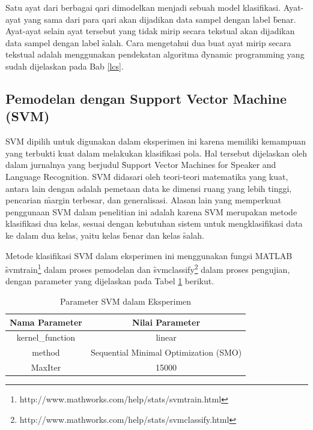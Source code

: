 Satu ayat dari berbagai qari dimodelkan menjadi sebuah model klasifikasi. Ayat-ayat yang sama dari para qari akan dijadikan data sampel dengan label \f{benar}. Ayat-ayat selain ayat tersebut yang tidak mirip secara tekstual akan dijadikan data sampel dengan label \f{salah}. Cara mengetahui dua buat ayat mirip secara tekstual adalah menggunakan pendekatan algoritma \f{dynamic programming} yang sudah dijelaskan pada Bab \ref{lcs}.

	\subsection{Pemodelan dengan Support Vector Machine (SVM)}
	SVM dipilih untuk digunakan dalam eksperimen ini karena memiliki kemampuan yang terbukti kuat dalam melakukan klasifikasi pola. Hal tersebut dijelaskan oleh \cite{campbell2006support} dalam jurnalnya yang berjudul \f{Support Vector Machines for Speaker and Language Recognition}. SVM didasari oleh teori-teori matematika yang kuat, antara lain dengan adalah pemetaan data ke dimensi ruang yang lebih tinggi, pencarian \f{margin} terbesar, dan generalisasi. Alasan lain yang memperkuat penggunaan SVM dalam penelitian ini adalah karena SVM merupakan metode klasifikasi dua kelas, sesuai dengan kebutuhan sistem untuk mengklasifikasi data ke dalam dua kelas, yaitu kelas \f{benar} dan kelas \f{salah}.

  Metode klasifikasi SVM dalam eksperimen ini menggunakan fungsi MATLAB \f{svmtrain}\footnote{http://www.mathworks.com/help/stats/svmtrain.html} dalam proses pemodelan dan \f{svmclassify}\footnote{http://www.mathworks.com/help/stats/svmclassify.html} dalam proses pengujian, dengan parameter yang dijelaskan pada Tabel \ref{table:parametersvm} berikut.

  \begin{table}
    \centering
    \caption{Parameter SVM dalam Eksperimen}
    \begin{tabular}{|c|c|}
      \hline
      \textbf{Nama Parameter} & \textbf{Nilai Parameter} \\ \hline
      kernel\_function & linear \\ \hline
      method & Sequential Minimal Optimization (SMO) \\ \hline
      MaxIter & 15000 \\ \hline
    \end{tabular}
    \label{table:parametersvm}
  \end{table}



